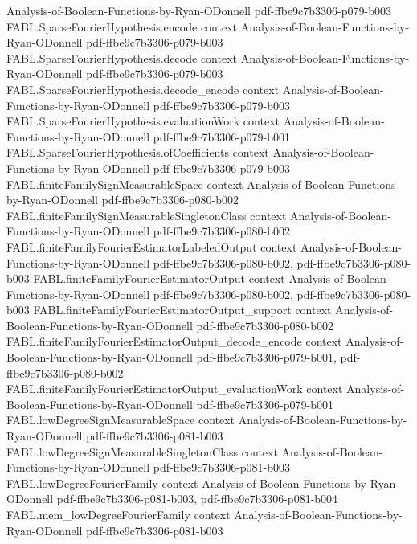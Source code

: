 \begin{theorem}
  {Analysis-of-Boolean-Functions-by-Ryan-ODonnell}
  {pdf-ffbe9c7b3306-p079-b003}
\proofstep
  {FABL.SparseFourierHypothesis.encode}
  {context}
  {Analysis-of-Boolean-Functions-by-Ryan-ODonnell}
  {pdf-ffbe9c7b3306-p079-b003}
\proofstep
  {FABL.SparseFourierHypothesis.decode}
  {context}
  {Analysis-of-Boolean-Functions-by-Ryan-ODonnell}
  {pdf-ffbe9c7b3306-p079-b003}
\proofstep
  {FABL.SparseFourierHypothesis.decode_encode}
  {context}
  {Analysis-of-Boolean-Functions-by-Ryan-ODonnell}
  {pdf-ffbe9c7b3306-p079-b003}
\proofstep
  {FABL.SparseFourierHypothesis.evaluationWork}
  {context}
  {Analysis-of-Boolean-Functions-by-Ryan-ODonnell}
  {pdf-ffbe9c7b3306-p079-b001}
\proofstep
  {FABL.SparseFourierHypothesis.ofCoefficients}
  {context}
  {Analysis-of-Boolean-Functions-by-Ryan-ODonnell}
  {pdf-ffbe9c7b3306-p079-b003}
\proofstep
  {FABL.finiteFamilySignMeasurableSpace}
  {context}
  {Analysis-of-Boolean-Functions-by-Ryan-ODonnell}
  {pdf-ffbe9c7b3306-p080-b002}
\proofstep
  {FABL.finiteFamilySignMeasurableSingletonClass}
  {context}
  {Analysis-of-Boolean-Functions-by-Ryan-ODonnell}
  {pdf-ffbe9c7b3306-p080-b002}
\proofstep
  {FABL.finiteFamilyFourierEstimatorLabeledOutput}
  {context}
  {Analysis-of-Boolean-Functions-by-Ryan-ODonnell}
  {pdf-ffbe9c7b3306-p080-b002,
    pdf-ffbe9c7b3306-p080-b003}
\proofstep
  {FABL.finiteFamilyFourierEstimatorOutput}
  {context}
  {Analysis-of-Boolean-Functions-by-Ryan-ODonnell}
  {pdf-ffbe9c7b3306-p080-b002,
    pdf-ffbe9c7b3306-p080-b003}
\proofstep
  {FABL.finiteFamilyFourierEstimatorOutput_support}
  {context}
  {Analysis-of-Boolean-Functions-by-Ryan-ODonnell}
  {pdf-ffbe9c7b3306-p080-b002}
\proofstep
  {FABL.finiteFamilyFourierEstimatorOutput_decode_encode}
  {context}
  {Analysis-of-Boolean-Functions-by-Ryan-ODonnell}
  {pdf-ffbe9c7b3306-p079-b001,
    pdf-ffbe9c7b3306-p080-b002}
\proofstep
  {FABL.finiteFamilyFourierEstimatorOutput_evaluationWork}
  {context}
  {Analysis-of-Boolean-Functions-by-Ryan-ODonnell}
  {pdf-ffbe9c7b3306-p079-b001}
\proofstep
  {FABL.lowDegreeSignMeasurableSpace}
  {context}
  {Analysis-of-Boolean-Functions-by-Ryan-ODonnell}
  {pdf-ffbe9c7b3306-p081-b003}
\proofstep
  {FABL.lowDegreeSignMeasurableSingletonClass}
  {context}
  {Analysis-of-Boolean-Functions-by-Ryan-ODonnell}
  {pdf-ffbe9c7b3306-p081-b003}
\proofstep
  {FABL.lowDegreeFourierFamily}
  {context}
  {Analysis-of-Boolean-Functions-by-Ryan-ODonnell}
  {pdf-ffbe9c7b3306-p081-b003,
    pdf-ffbe9c7b3306-p081-b004}
\proofstep
  {FABL.mem_lowDegreeFourierFamily}
  {context}
  {Analysis-of-Boolean-Functions-by-Ryan-ODonnell}
  {pdf-ffbe9c7b3306-p081-b003}

\end{theorem}
